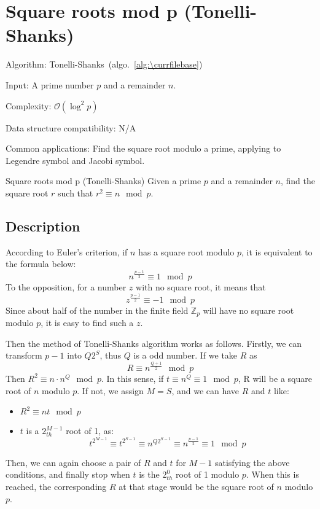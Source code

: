 \documentclass[catalog.tex]{subfiles}
\begin{document}
\def\pbname{Square roots mod p (Tonelli-Shanks)} %

\section{\pbname} 

\begin{overview}
\item [Algorithm:] Tonelli-Shanks~(algo.~\ref{alg:\currfilebase}) 
\item [Input:] A prime number $p$ and a remainder $n$.
\item [Complexity:] $\mathcal{O}(\log^2 p)$
\item [Data structure compatibility:] N/A
\item [Common applications:] Find the square root modulo a prime, applying to Legendre symbol and Jacobi symbol.
\end{overview}


\begin{problem}{\pbname}
	Given a prime $p$ and a remainder $n$, find the square root $r$ such that $r^2 \equiv n \mod p$.
\end{problem}


\subsection*{Description}
According to Euler's criterion, if $n$ has a square root modulo $p$, it is equivalent to the formula below:
$$n^{\frac{p-1}{2}} \equiv 1 \mod p$$
To the opposition, for a number $z$ with no square root, it means that 
$$z^{\frac{p-1}{2}} \equiv -1 \mod p$$
Since about half of the number in the finite field $\mathbb{Z}_p$ will have no square root modulo $p$, it is easy to find such a $z$.

Then the method of Tonelli-Shanks algorithm works as follows. Firstly, we can transform $p-1$ into $Q2^S$, thus $Q$ is a odd number. If we take $R$ as
$$R \equiv n^{\frac{Q+1}{2}} \mod p$$
Then $R^2 \equiv n\cdot n^Q \mod p$. In this sense, if $t \equiv n^Q \equiv 1 \mod p$, R will be a square root of $n$ modulo $p$. If not, we assign $M = S$, and we can have $R$ and $t$ like:
\begin{itemize}
    \item $R^2 \equiv nt \mod p$
    \item $t$ is a $2^{M-1}_{th}$ root of 1, as:
    $$t^{2^{M-1}} \equiv t^{2^{S-1}} \equiv n^{Q2^{S-1}} \equiv n^{\frac{p-1}{2}} \equiv 1 \mod p$$
\end{itemize}
Then, we can again choose a pair of $R$ and $t$ for $M-1$ satisfying the above conditions, and finally stop when $t$ is the $2^0_{th}$ root of 1 modulo $p$. When this is reached, the corresponding $R$ at that stage would be the square root of $n$ modulo $p$.
\end{document}

